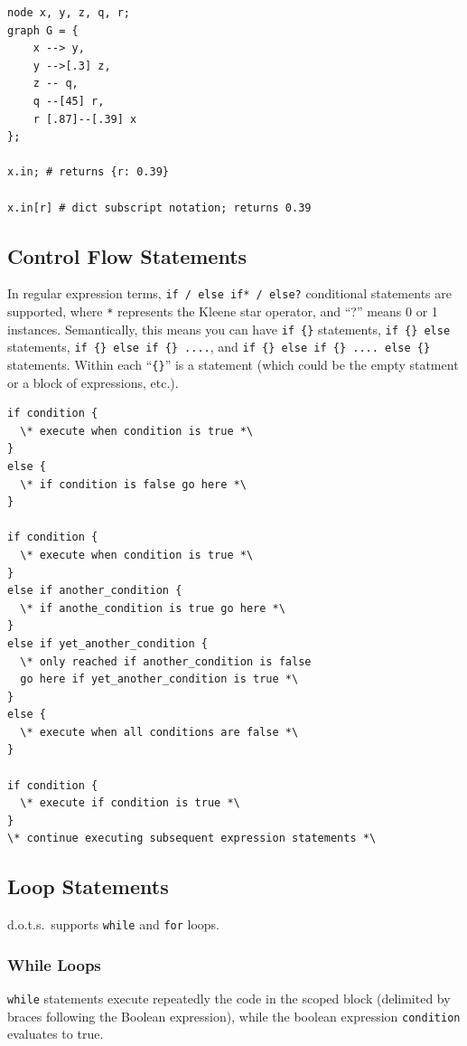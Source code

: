 \documentclass{article}
\newcommand{\pltlang}{d.o.t.s.} %
\newcommand{\code}[1]{\texttt{#1}} %
\begin{document}
\begin{lstlisting}[language=pltLang, label=lst:member-access]
node x, y, z, q, r;
graph G = {
    x --> y,
    y -->[.3] z,
    z -- q,
    q --[45] r,
    r [.87]--[.39] x
};

x.in; # returns {r: 0.39}

x.in[r] # dict subscript notation; returns 0.39

\end{lstlisting}

\subsection{Control Flow Statements}
In regular expression terms, \code{if / else if* / else?} conditional statements are supported, where \code{*} represents the Kleene star operator, and ``?'' means 0 or 1 instances. Semantically, this means you can have \code{if \{\}} statements, \code{if \{\} else} statements, \code{if \{\} else if \{\} ....}, and \code{if \{\} else if \{\} .... else \{\}} statements. Within each ``\code{\{\}}'' is a statement (which could be the empty statment or a block of expressions, etc.).

\begin{lstlisting}[language=pltLang, label=lst:if-else]
if condition {
  \* execute when condition is true *\
}
else {
  \* if condition is false go here *\
}

if condition {
  \* execute when condition is true *\
}
else if another_condition {
  \* if anothe_condition is true go here *\
}
else if yet_another_condition {
  \* only reached if another_condition is false
  go here if yet_another_condition is true *\
}
else {
  \* execute when all conditions are false *\
}

if condition {
  \* execute if condition is true *\
}
\* continue executing subsequent expression statements *\

\end{lstlisting}

\subsection{Loop Statements}
\pltlang\ supports \code{while} and \code{for} loops.

\subsubsection{While Loops}

\code{while} statements execute repeatedly the code in the scoped block (delimited by braces following the Boolean expression), while the boolean expression \code{condition} evaluates to true. 
\end{document}
